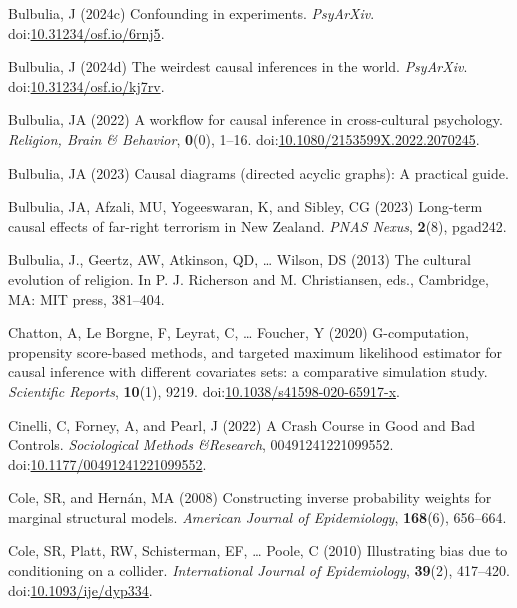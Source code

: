 \documentclass[
  single column]{article}
\newlength{\cslhangindent}
\newenvironment{CSLReferences}[2] %
 {\begin{list}{}{%
  \setlength{\itemindent}{0pt}
  \setlength{\leftmargin}{0pt}
  \setlength{\parsep}{0pt}
  \ifodd #1
   \setlength{\leftmargin}{\cslhangindent}
   \setlength{\itemindent}{-1\cslhangindent}
  \fi
  \setlength{\itemsep}{#2\baselineskip}}}
 {\end{list}}
\begin{document}
\begin{CSLReferences}{1}{0}
Bulbulia, J (2024c) Confounding in experiments. \emph{PsyArXiv}.
doi:\href{https://doi.org/10.31234/osf.io/6rnj5}{10.31234/osf.io/6rnj5}.

Bulbulia, J (2024d) The weirdest causal inferences in the world.
\emph{PsyArXiv}.
doi:\href{https://doi.org/10.31234/osf.io/kj7rv}{10.31234/osf.io/kj7rv}.

Bulbulia, JA (2022) A workflow for causal inference in cross-cultural
psychology. \emph{Religion, Brain \& Behavior}, \textbf{0}(0), 1--16.
doi:\href{https://doi.org/10.1080/2153599X.2022.2070245}{10.1080/2153599X.2022.2070245}.

Bulbulia, JA (2023) Causal diagrams (directed acyclic graphs): A
practical guide.

Bulbulia, JA, Afzali, MU, Yogeeswaran, K, and Sibley, CG (2023)
Long-term causal effects of far-right terrorism in {N}ew {Z}ealand.
\emph{PNAS Nexus}, \textbf{2}(8), pgad242.

Bulbulia, J., Geertz, AW, Atkinson, QD, \ldots{} Wilson, DS (2013) The
cultural evolution of religion. In P. J. Richerson and M. Christiansen,
eds., Cambridge, MA: MIT press, 381--404.

Chatton, A, Le Borgne, F, Leyrat, C, \ldots{} Foucher, Y (2020)
G-computation, propensity score-based methods, and targeted maximum
likelihood estimator for causal inference with different covariates
sets: a comparative simulation study. \emph{Scientific Reports},
\textbf{10}(1), 9219.
doi:\href{https://doi.org/10.1038/s41598-020-65917-x}{10.1038/s41598-020-65917-x}.

Cinelli, C, Forney, A, and Pearl, J (2022) A Crash Course in Good and
Bad Controls. \emph{Sociological Methods \&Research}, 00491241221099552.
doi:\href{https://doi.org/10.1177/00491241221099552}{10.1177/00491241221099552}.

Cole, SR, and Hernán, MA (2008) Constructing inverse probability weights
for marginal structural models. \emph{American Journal of Epidemiology},
\textbf{168}(6), 656--664.

Cole, SR, Platt, RW, Schisterman, EF, \ldots{} Poole, C (2010)
Illustrating bias due to conditioning on a collider. \emph{International
Journal of Epidemiology}, \textbf{39}(2), 417--420.
doi:\href{https://doi.org/10.1093/ije/dyp334}{10.1093/ije/dyp334}.


\end{CSLReferences}
\end{document}
